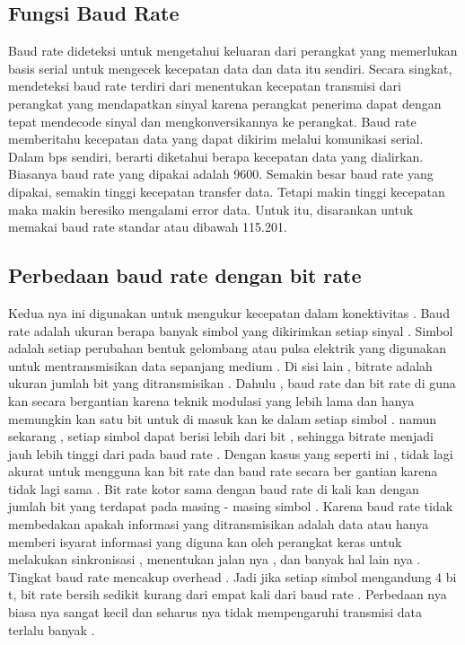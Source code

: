 \subsection{Fungsi Baud Rate}
Baud rate dideteksi untuk mengetahui keluaran dari perangkat yang memerlukan basis serial untuk mengecek kecepatan data dan data itu sendiri. \cite{anderson1973method} Secara singkat, mendeteksi baud rate terdiri dari menentukan kecepatan transmisi dari perangkat yang mendapatkan sinyal karena perangkat penerima dapat dengan tepat mendecode sinyal dan mengkonversikannya ke perangkat. Baud rate memberitahu kecepatan data yang dapat dikirim melalui komunikasi serial. Dalam bps sendiri, berarti diketahui berapa kecepatan data yang dialirkan. Biasanya baud rate yang dipakai adalah 9600. Semakin besar baud rate yang dipakai, semakin tinggi kecepatan transfer data. Tetapi makin tinggi kecepatan maka makin beresiko mengalami error data. Untuk itu, disarankan untuk memakai baud rate standar atau dibawah 115.201.

\subsection{ Perbedaan baud rate dengan bit rate }
Kedua nya ini digunakan untuk mengukur kecepatan dalam konektivitas . Baud rate adalah ukuran berapa banyak simbol yang dikirimkan setiap sinyal . Simbol adalah setiap perubahan bentuk gelombang atau pulsa elektrik yang digunakan untuk mentransmisikan data sepanjang medium . Di sisi lain , bitrate adalah ukuran jumlah bit yang ditransmisikan . Dahulu , baud rate dan bit rate di guna kan secara bergantian karena teknik modulasi yang lebih lama dan  hanya memungkin kan satu bit untuk di masuk kan ke dalam setiap simbol . namun sekarang , setiap simbol dapat berisi lebih dari bit , sehingga bitrate menjadi jauh lebih tinggi dari pada baud rate . Dengan kasus yang seperti ini , tidak lagi akurat untuk mengguna kan bit rate dan baud rate secara ber gantian karena tidak lagi sama . Bit rate kotor sama dengan baud rate di kali kan dengan jumlah bit yang terdapat pada masing - masing simbol .
Karena baud rate tidak membedakan apakah informasi yang ditransmisikan adalah data atau hanya memberi isyarat informasi yang diguna kan oleh perangkat keras untuk melakukan sinkronisasi , menentukan jalan nya , dan banyak hal lain nya . Tingkat baud rate mencakup overhead . Jadi jika setiap simbol mengandung 4 bi t, bit rate bersih sedikit kurang dari empat kali dari baud rate . Perbedaan nya biasa nya sangat kecil dan seharus nya tidak mempengaruhi transmisi data terlalu banyak .

